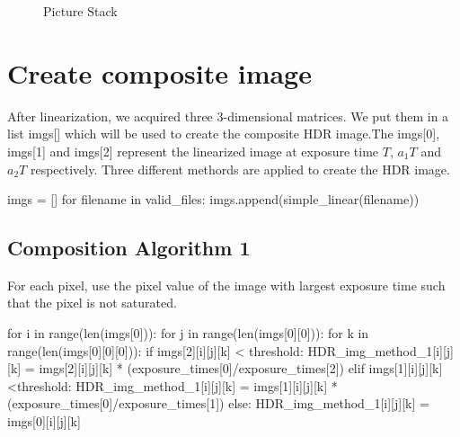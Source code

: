\documentclass[10pt,twocolumn,letterpaper]{article}
\begin{document}
\begin{figure}[t]

\caption{Picture Stack}
\label{fig:picturestack}
\end{figure} 


\section{Create composite image}
\label{sec:create}
After linearization, we acquired three 3-dimensional matrices. We put them in a list imgs[] which will be used to create the composite HDR image.The imgs[0], imgs[1] and imgs[2] represent the linearized image at exposure time $T$, $a_{1}T$ and $a_{2}T$ respectively. Three different methords are applied to create the HDR image.
\begin{python}
imgs = []
for filename in valid_files:
	imgs.append(simple_linear(filename))
\end{python}

\subsection{Composition Algorithm 1}
For each pixel, use the pixel value of the image with largest exposure time such that the pixel is not saturated. \\
\begin{python}
for i in  range(len(imgs[0])):
	for j in range(len(imgs[0][0])):
		for k in range(len(imgs[0][0][0])):
			if imgs[2][i][j][k] < threshold:
				HDR_img_method_1[i][j][k] 
				= imgs[2][i][j][k] * 
				(exposure_times[0]/exposure_times[2])
			elif imgs[1][i][j][k] <threshold:
				HDR_img_method_1[i][j][k] 
				= imgs[1][i][j][k] * 
				(exposure_times[0]/exposure_times[1])
			else:
				HDR_img_method_1[i][j][k] 
				= imgs[0][i][j][k]
\end{python}
\end{document}
